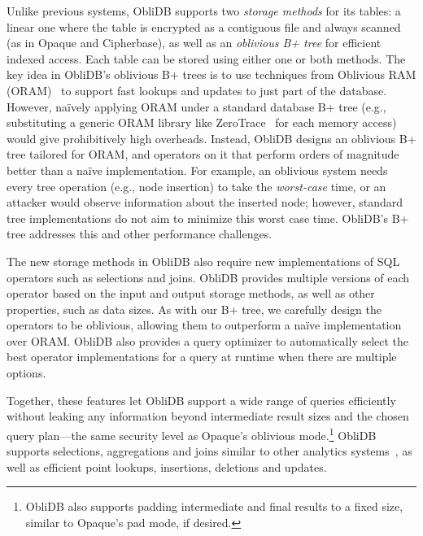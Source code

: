 \documentclass[letterpaper,twocolumn,10pt]{article}
\def\name/{ObliDB}
\begin{document}
Unlike previous systems, \name/ supports two \emph{storage methods} for its tables: a linear one where the table is encrypted as a contiguous file and always scanned (as in Opaque and Cipherbase), as well as an \emph{oblivious B+ tree} for efficient indexed access.
Each table can be stored using either one or both methods.
The key idea in \name/'s oblivious B+ trees is to use techniques from Oblivious RAM (ORAM)~\cite{SDS+13} to support fast lookups and updates to just part of the database.
However, na\"ively applying ORAM under a standard database B+ tree (e.g., substituting a generic ORAM library like ZeroTrace~\cite{SGF17} for each memory access) would give prohibitively high overheads.
Instead, \name/ designs an oblivious B+ tree tailored for ORAM, and operators on it that perform orders of magnitude better than a na\"ive implementation.
For example, an oblivious system needs every tree operation (e.g., node insertion) to take the \emph{worst-case} time, or an attacker would observe information about the inserted node; however, standard tree implementations do not aim to minimize this worst case time.
\name/'s B+ tree addresses this and other performance challenges.

The new storage methods in \name/ also require new implementations of SQL operators such as selections and joins.
\name/ provides multiple versions of each operator based on the input and output storage methods, as well as other properties, such as data sizes.
As with our B+ tree, we carefully design the operators to be oblivious, allowing them to outperform a na\"ive implementation over ORAM.
\name/ also provides a query optimizer to automatically select the best operator implementations for a query at runtime when there are multiple options.

Together, these features let \name/ support a wide range of queries efficiently without leaking any information beyond intermediate result sizes and the chosen query plan---the same security level as Opaque's oblivious mode.\footnote{
    \name/ also supports padding intermediate and final results to a fixed size, similar to Opaque's pad mode, if desired.
}
\name/ supports selections, aggregations and joins similar to other analytics systems~\cite{ZDB+17,cipherbase}, as well as efficient point lookups, insertions, deletions and updates.
\end{document}
